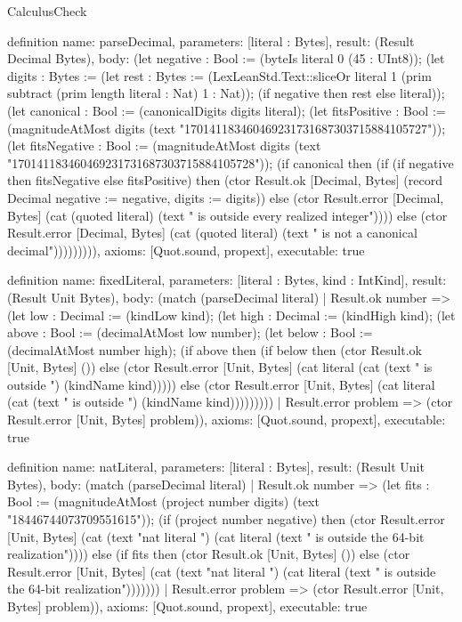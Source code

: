 \begin{lexlean}{CalculusCheck}
\begin{semanticmodule}
definition{
  name: parseDecimal,
  parameters: [literal : Bytes],
  result: (Result Decimal Bytes),
  body: (let negative : Bool := (byteIs literal 0 (45 : UInt8)); (let digits : Bytes := (let rest : Bytes := (LexLeanStd.Text::sliceOr literal 1 (prim subtract (prim length literal : Nat) 1 : Nat)); (if negative then rest else literal)); (let canonical : Bool := (canonicalDigits digits literal); (let fitsPositive : Bool := (magnitudeAtMost digits (text "170141183460469231731687303715884105727")); (let fitsNegative : Bool := (magnitudeAtMost digits (text "170141183460469231731687303715884105728")); (if canonical then (if (if negative then fitsNegative else fitsPositive) then (ctor Result.ok [Decimal, Bytes] (record Decimal {negative := negative, digits := digits})) else (ctor Result.error [Decimal, Bytes] (cat (quoted literal) (text " is outside every realized integer")))) else (ctor Result.error [Decimal, Bytes] (cat (quoted literal) (text " is not a canonical decimal"))))))))),
  axioms: [Quot.sound, propext],
  executable: true
}

definition{
  name: fixedLiteral,
  parameters: [literal : Bytes, kind : IntKind],
  result: (Result Unit Bytes),
  body: (match (parseDecimal literal)
    | Result.ok number => (let low : Decimal := (kindLow kind); (let high : Decimal := (kindHigh kind); (let above : Bool := (decimalAtMost low number); (let below : Bool := (decimalAtMost number high); (if above then (if below then (ctor Result.ok [Unit, Bytes] ()) else (ctor Result.error [Unit, Bytes] (cat literal (cat (text " is outside ") (kindName kind))))) else (ctor Result.error [Unit, Bytes] (cat literal (cat (text " is outside ") (kindName kind)))))))))
    | Result.error problem => (ctor Result.error [Unit, Bytes] problem)),
  axioms: [Quot.sound, propext],
  executable: true
}

definition{
  name: natLiteral,
  parameters: [literal : Bytes],
  result: (Result Unit Bytes),
  body: (match (parseDecimal literal)
    | Result.ok number => (let fits : Bool := (magnitudeAtMost (project number digits) (text "18446744073709551615")); (if (project number negative) then (ctor Result.error [Unit, Bytes] (cat (text "nat literal ") (cat literal (text " is outside the 64-bit realization")))) else (if fits then (ctor Result.ok [Unit, Bytes] ()) else (ctor Result.error [Unit, Bytes] (cat (text "nat literal ") (cat literal (text " is outside the 64-bit realization")))))))
    | Result.error problem => (ctor Result.error [Unit, Bytes] problem)),
  axioms: [Quot.sound, propext],
  executable: true
}


\end{semanticmodule}
\end{lexlean}
